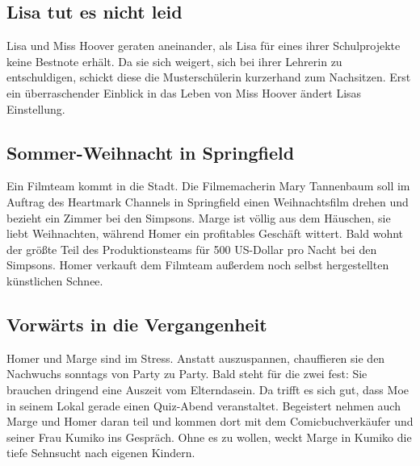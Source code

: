 \subsection{Lisa tut es nicht leid}
Lisa und Miss Hoover geraten aneinander, als Lisa für eines ihrer Schulprojekte keine Bestnote erhält. Da sie sich weigert, sich bei ihrer Lehrerin zu entschuldigen, schickt diese die Musterschülerin kurzerhand zum Nachsitzen. Erst ein überraschender Einblick in das Leben von Miss Hoover ändert Lisas Einstellung.


\subsection{Sommer-Weihnacht in Springfield}
Ein Filmteam kommt in die Stadt. Die Filmemacherin Mary Tannenbaum soll im Auftrag des Heartmark Channels in Springfield einen Weihnachtsfilm drehen und bezieht ein Zimmer bei den Simpsons. Marge ist völlig aus dem Häuschen, sie liebt Weihnachten, während Homer ein profitables Geschäft wittert. Bald wohnt der größte Teil des Produktionsteams für 500 US-Dollar pro Nacht bei den Simpsons. Homer verkauft dem Filmteam außerdem noch selbst hergestellten künstlichen Schnee.


\subsection{Vorwärts in die Vergangenheit}
Homer und Marge sind im Stress. Anstatt auszuspannen, chauffieren sie den Nachwuchs sonntags von Party zu Party. Bald steht für die zwei fest: Sie brauchen dringend eine Auszeit vom Elterndasein. Da trifft es sich gut, dass Moe in seinem Lokal gerade einen Quiz-Abend veranstaltet. Begeistert nehmen auch Marge und Homer daran teil und kommen dort mit dem Comicbuchverkäufer und seiner Frau Kumiko ins Gespräch. Ohne es zu wollen, weckt Marge in Kumiko die tiefe Sehnsucht nach eigenen Kindern.


